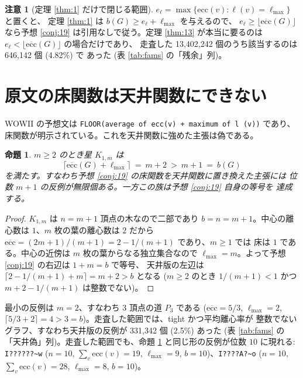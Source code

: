 \documentclass[paper=a4,fontsize=10.5pt,jafontsize=10.5pt]{jlreq}
\theoremstyle{plain}
\newtheorem{proposition}[theorem]{命題}
\theoremstyle{definition}
\newtheorem{remark}[theorem]{注意}
\begin{document}
\begin{remark}[定理 \ref{thm:1} だけで閉じる範囲]\label{rem:cov}
$e_{\ell} = \max\{\mathrm{ecc}(v) : \ell(v) = \ell_{\max}\}$ と置くと、
定理 \ref{thm:1} は $b(G) \ge e_{\ell} + \ell_{\max}$ を与えるので、
$e_{\ell} \ge \lfloor \overline{\mathrm{ecc}}(G) \rfloor$ なら予想
\ref{conj:19} は引用なしで従う。定理 \ref{thm:13} が本当に要るのは
$e_{\ell} < \lfloor \overline{\mathrm{ecc}}(G) \rfloor$ の場合だけであり、
走査した 13,402,242 個のうち該当するのは 646,142 個 (4.82\%) で
あった (表 \ref{tab:fams} の「残余」列)。
\end{remark}

\section{原文の床関数は天井関数にできない}\label{sec:ceil}

WOWII の予想文は \texttt{FLOOR(average of ecc(v) + maximum of l (v))} であり、
床関数が明示されている。これを天井関数に強めた主張は偽である。

\begin{proposition}\label{prop:ceil}
$m \ge 2$ のとき星 $K_{1,m}$ は
\[ \bigl\lceil \overline{\mathrm{ecc}}(G) + \ell_{\max} \bigr\rceil
   \ = \ m + 2 \ > \ m + 1 \ = \ b(G) \]
を満たす。すなわち予想 \ref{conj:19} の床関数を天井関数に置き換えた主張には
位数 $m + 1$ の反例が無限個ある。一方この族は予想 \ref{conj:19} 自身の等号を
達成する。
\end{proposition}

\begin{proof}
$K_{1,m}$ は $n = m+1$ 頂点の木なので二部であり $b = n = m+1$。中心の離心数は
$1$、$m$ 枚の葉の離心数は $2$ だから
$\overline{\mathrm{ecc}} = (2m+1)/(m+1) = 2 - 1/(m+1)$ であり、$m \ge 1$ では
床は $1$ である。中心の近傍は $m$ 枚の葉からなる独立集合なので
$\ell_{\max} = m$。よって予想 \ref{conj:19} の右辺は $1 + m = b$ で等号、
天井版の左辺は $\lceil 2 - 1/(m+1) + m \rceil = m + 2 > b$ となる
($m \ge 2$ のとき $1/(m+1) < 1$ かつ $m + 2 - 1/(m+1)$ は整数でない)。
\end{proof}

最小の反例は $m = 2$、すなわち $3$ 頂点の道 $P_3$ である
($\overline{\mathrm{ecc}} = 5/3$, $\ell_{\max} = 2$,
$\lceil 5/3 + 2 \rceil = 4 > 3 = b$)。走査した範囲では、tight かつ平均離心率が
整数でないグラフ、すなわち天井版の反例が 331,342 個 (2.5\%)
あった (表 \ref{tab:fams} の「天井偽」列)。走査した範囲でも、命題 \ref{prop:ceil} と同じ形の反例が位数 $10$ に現れる: \texttt{I??????\textasciitilde{}w} ($n = 10$, $\sum_v \mathrm{ecc}(v) = 19$, $\ell_{\max} = 9$, $b = 10$)、\texttt{I????A?\textasciitilde{}o} ($n = 10$, $\sum_v \mathrm{ecc}(v) = 28$, $\ell_{\max} = 8$, $b = 10$)。
\end{document}

